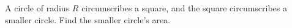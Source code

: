 A circle of radius $R$ circumscribes a square, and the square circumscribes a smaller circle. Find the smaller circle's area.
